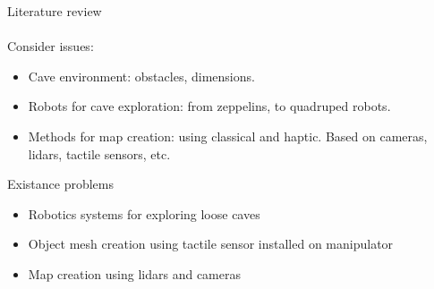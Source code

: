 \documentclass[aspectratio=169]{beamer}
\begin{document}



\begin{frame}[t]{Literature review}
    \framesubtitle{}
    \vspace{-0.3cm}
    \large
    Consider issues:
    \vspace{-0.1cm}
    \begin{itemize}
        \item Cave environment: obstacles, dimensions.
        \item Robots for cave exploration: from zeppelins, to quadruped robots.
        \item Methods for map creation: using classical and haptic. Based on cameras, lidars, tactile sensors, etc.
    \end{itemize}
    \vspace{-0.2cm}

    \begin{block}{Existance problems}
        \begin{itemize}
            \item Robotics systems for exploring loose caves
            \item Object mesh creation using tactile sensor installed on manipulator
            \item Map creation using lidars and cameras
        \end{itemize}
    \end{block}
    \vspace{-0.2cm}

\end{frame}
\end{document}
